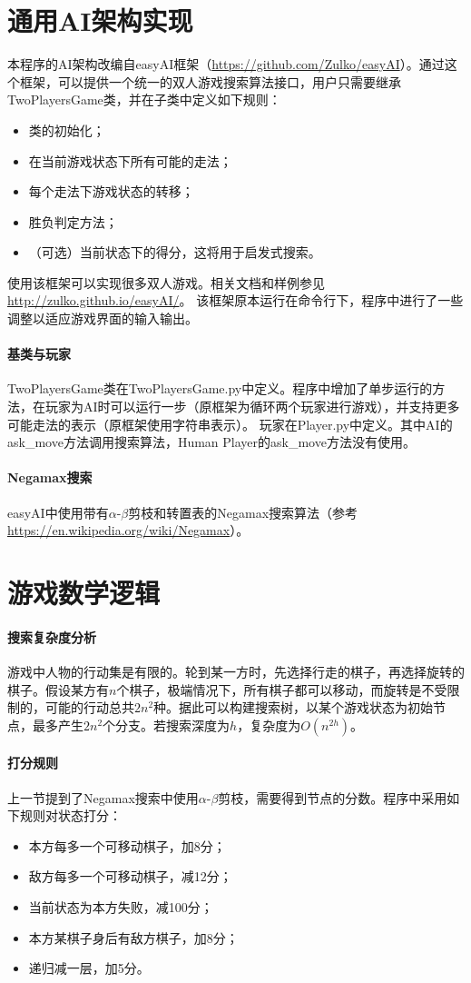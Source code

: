 \section{通用AI架构实现}
本程序的AI架构改编自easyAI框架（\url{https://github.com/Zulko/easyAI}）。通过这个框架，可以提供一个统一的双人游戏搜索算法接口，用户只需要继承{\ttfamily TwoPlayersGame}类，并在子类中定义如下规则：
\begin{itemize}
	\item 类的初始化；
	\item 在当前游戏状态下所有可能的走法；
	\item 每个走法下游戏状态的转移；
	\item 胜负判定方法；
	\item （可选）当前状态下的得分，这将用于启发式搜索。
\end{itemize}
使用该框架可以实现很多双人游戏。相关文档和样例参见\url{http://zulko.github.io/easyAI/}。
该框架原本运行在命令行下，程序中进行了一些调整以适应游戏界面的输入输出。
\paragraph{基类与玩家}
{\ttfamily TwoPlayersGame}类在{\ttfamily TwoPlayersGame.py}中定义。程序中增加了单步运行的方法，在玩家为AI时可以运行一步（原框架为循环两个玩家进行游戏），并支持更多可能走法的表示（原框架使用字符串表示）。
玩家在{\ttfamily Player.py}中定义。其中AI的{\ttfamily ask\_move}方法调用搜索算法，Human Player的{\ttfamily ask\_move}方法没有使用。
\paragraph{Negamax搜索}
easyAI中使用带有$\alpha$-$\beta$剪枝和转置表的Negamax搜索算法（参考\url{https://en.wikipedia.org/wiki/Negamax}）。

\section{游戏数学逻辑}
\paragraph{搜索复杂度分析}游戏中人物的行动集是有限的。轮到某一方时，先选择行走的棋子，再选择旋转的棋子。假设某方有$n$个棋子，极端情况下，所有棋子都可以移动，而旋转是不受限制的，可能的行动总共$2n^2$种。据此可以构建搜索树，以某个游戏状态为初始节点，最多产生$2n^2$个分支。若搜索深度为$h$，复杂度为$O(n^{2h})$。
\paragraph{打分规则}
上一节提到了Negamax搜索中使用$\alpha$-$\beta$剪枝，需要得到节点的分数。程序中采用如下规则对状态打分：
\begin{itemize}
	\item 本方每多一个可移动棋子，加8分；
	\item 敌方每多一个可移动棋子，减12分；
	\item 当前状态为本方失败，减100分；
	\item 本方某棋子身后有敌方棋子，加8分；
	\item 递归减一层，加5分。
\end{itemize}


